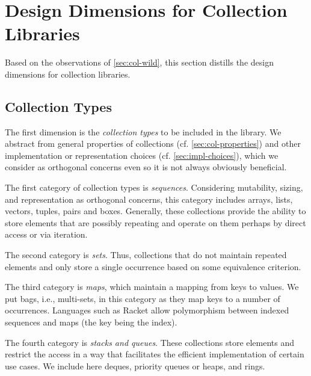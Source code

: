 \documentclass[sigconf, authorversion]{acmart}
\begin{document}
\section{Design Dimensions for Collection Libraries}
\label{sec:dimensions}

Based on the observations of \cref{sec:col-wild},
this section distills the design dimensions for collection libraries. 

\subsection{Collection Types}
\label{sec:col-types}

The first dimension is the \emph{collection types} to be included in the library.
We abstract %
from general properties of collections (cf. \cref{sec:col-properties})
and other implementation or representation choices
(cf. \cref{sec:impl-choices}),
which we consider as orthogonal concerns
even so it is not always obviously beneficial.

The first category of collection types is \emph{sequences}.
Considering mutability, sizing, and representation
as orthogonal concerns,
this category includes arrays, lists, vectors, tuples, pairs and boxes.
Generally, these collections provide the ability to store elements
that are possibly repeating
and operate on them perhaps by direct access or via iteration.

The second category is \emph{sets}.
Thus, collections that do not maintain repeated elements
and only store a single occurrence based on some equivalence criterion.

The third category is \emph{maps}, which maintain a mapping from keys to values.
We put bags, i.e., multi-sets, in this category as they map keys to a number of occurrences.
Languages such as Racket allow polymorphism between indexed sequences and maps (the key being the index).

The fourth category is \emph{stacks and queues}.
These collections store elements
and restrict the access in a way
that facilitates the efficient implementation of certain use cases.
We include here deques, priority queues or heaps, and rings.
\end{document}
